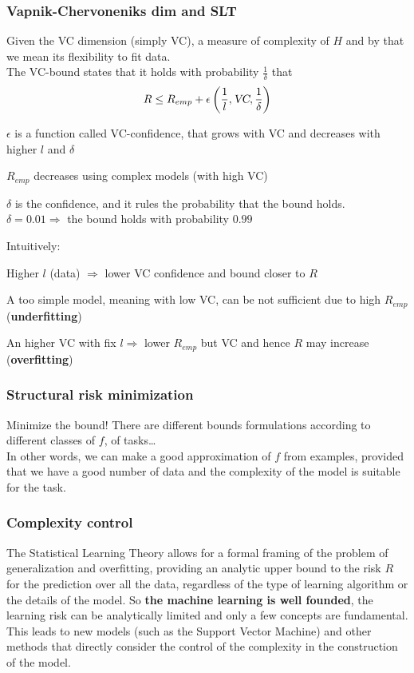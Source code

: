 \documentclass[10pt]{report}
\begin{document}
\subsubsection{Vapnik-Chervoneniks dim and SLT} Given the VC dimension (simply VC), a measure of complexity of $H$ and by that we mean its flexibility to fit data.\\
The VC-bound states that it holds with probability $\frac{1}{\delta}$ that $$R \leq R_{emp} + \epsilon\left(\frac{1}{l}, \textsl{VC},\frac{1}{\delta}\right)$$
\begin{list}{}{}
	\item $\epsilon$ is a function called VC-confidence, that grows with VC and decreases with higher $l$ and $\delta$
	\item $R_{emp}$ decreases using complex models (with high VC)
	\item $\delta$ is the confidence, and it rules the probability that the bound holds.\\
	$\delta = 0.01 \Rightarrow$ the bound holds with probability $0.99$
\end{list}
Intuitively:
\begin{list}{}{}
	\item Higher $l$ (data) $\Rightarrow$ lower VC confidence and bound closer to $R$
	\item A too simple model, meaning with low VC, can be not sufficient due to high $R_{emp}$ (\textbf{underfitting})
	\item An higher VC with fix $l \Rightarrow$ lower $R_{emp}$ but VC and hence $R$ may increase (\textbf{overfitting})
\end{list}
\subsubsection{Structural risk minimization} Minimize the bound! There are different bounds formulations according to different classes of $f$, of tasks\ldots\\
In other words, we can make a good approximation of $f$ from examples, provided that we have a good number of data and the complexity of the model is suitable for the task.
\subsubsection{Complexity control} The Statistical Learning Theory allows for a formal framing of the problem of generalization and overfitting, providing an analytic upper bound to the risk $R$ for the prediction over all the data, regardless of the type of learning algorithm or the details of the model. So \textbf{the machine learning is well founded}, the learning risk can be analytically limited and only a few concepts are fundamental. This leads to new models (such as the Support Vector Machine) and other methods that directly consider the control of the complexity in the construction of the model.
\end{document}
